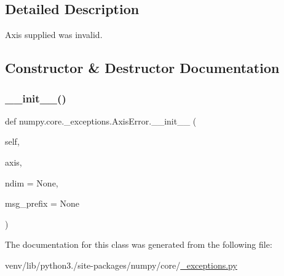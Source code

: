\subsection{Detailed Description}
\begin{DoxyVerb}Axis supplied was invalid. \end{DoxyVerb}
 

\subsection{Constructor \& Destructor Documentation}
\mbox{\label{classnumpy_1_1core_1_1__exceptions_1_1AxisError_a463663b3f25704e21f3418c6db30952e}} 
\subsubsection{\texorpdfstring{\+\_\+\+\_\+init\+\_\+\+\_\+()}{\_\_init\_\_()}}
{\footnotesize\ttfamily def numpy.\+core.\+\_\+exceptions.\+Axis\+Error.\+\_\+\+\_\+init\+\_\+\+\_\+ (\begin{DoxyParamCaption}\item[{}]{self,  }\item[{}]{axis,  }\item[{}]{ndim = {\ttfamily None},  }\item[{}]{msg\+\_\+prefix = {\ttfamily None} }\end{DoxyParamCaption})}



The documentation for this class was generated from the following file\+:\begin{DoxyCompactItemize}
\item 
venv/lib/python3./site-\/packages/numpy/core/\hyperlink{__exceptions_8py}{\+\_\+exceptions.\+py}\end{DoxyCompactItemize}
